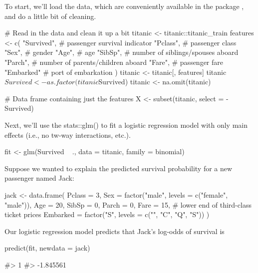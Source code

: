To start, we'll load the data, which are conveniently available in the
 package \citep{R-titanic}, and do a little bit of
cleaning.

\begin{Schunk}
\begin{Sinput}
# Read in the data and clean it up a bit
titanic <- titanic::titanic_train
features <- c(
  "Survived",  # passenger survival indicator
  "Pclass",    # passenger class
  "Sex",       # gender
  "Age",       # age
  "SibSp",     # number of siblings/spouses aboard
  "Parch",     # number of parents/children aboard
  "Fare",      # passenger fare
  "Embarked"   # port of embarkation
)
titanic <- titanic[, features]
titanic$Survived <- as.factor(titanic$Survived)
titanic <- na.omit(titanic)

# Data frame containing just the features
X <- subset(titanic, select = -Survived)
\end{Sinput}
\end{Schunk}

Next, we'll use the stats::glm() to fit a logistic regression model with
only main effects (i.e., no tw-way interactions, etc.).

\begin{Schunk}
\begin{Sinput}
fit <- glm(Survived ~ ., data = titanic, family = binomial)
\end{Sinput}
\end{Schunk}

Suppose we wanted to explain the predicted survival probability for a
new passenger named Jack:

\begin{Schunk}
\begin{Sinput}
jack <- data.frame(
  Pclass = 3,
  Sex = factor("male", levels = c("female", "male")),
  Age = 20,
  SibSp = 0,
  Parch = 0,
  Fare = 15,  # lower end of third-class ticket prices
  Embarked = factor("S", levels = c("", "C", "Q", "S"))
)
\end{Sinput}
\end{Schunk}

Our logistic regression model predicts that Jack's log-odds of survival
is

\begin{Schunk}
\begin{Sinput}
predict(fit, newdata = jack)
\end{Sinput}
\begin{Soutput}
#>         1 
#> -1.845561
\end{Soutput}
\end{Schunk}

